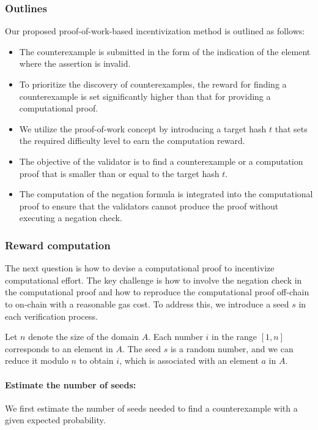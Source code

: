 \documentclass[runningheads]{llncs}
\begin{document}
\subsubsection{Outlines}
Our proposed proof-of-work-based incentivization method is outlined as follows:
\begin{itemize}
\item The counterexample is submitted in the form of the indication of the element where the assertion is invalid.
\item To prioritize the discovery of counterexamples, the reward for finding a counterexample is set significantly higher than that for providing a computational proof.
\item We utilize the proof-of-work concept by introducing a target hash \( t \) that sets the required difficulty level to earn the computation reward.
\item The objective of the validator is to find a counterexample or a computation proof that is smaller than or equal to the target hash \( t \).
\item The computation of the negation formula is integrated into the computational proof to ensure that the validators cannot produce the proof without executing a negation check.
\end{itemize}
\subsubsection{Reward computation}
The next question is how to devise a computational proof to incentivize computational effort. The key challenge is how to involve the negation check in the computational proof and how to reproduce the computational proof off-chain to on-chain with a reasonable gas cost. To address this, we introduce a seed $s$ in each verification process.

Let \( n \) denote the size of the domain \( A \). Each number \( i \) in the range \([1, n]\) corresponds to an element in \( A \). The seed \( s \) is a random number, and we can reduce it modulo \( n \) to obtain \( i \), which is associated with an element \( a \) in \( A \).

\paragraph{Estimate the number of seeds:} We first estimate the number of seeds needed to find a counterexample with a given expected probability. %
\end{document}
